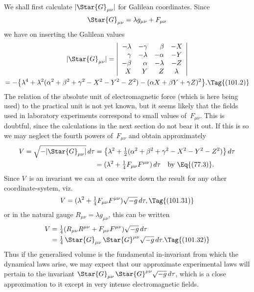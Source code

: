 \documentclass[12pt]{book}
\begin{document}
We shall first calculate $|\Star{G}_{\mu\nu}|$ for Galilean coordinates. Since
\[
\Star{G}_{\mu\nu} = \lambda g_{\mu\nu} + F_{\mu\nu}
\]
we have on inserting the Galilean values
\begin{multline*}
  |\Star{G}_{\mu\nu}|
  = \left\lvert
  \begin{array}{r@{\quad}r@{\quad}r@{\quad}c}
  -\lambda & -\gamma & \beta & -X \\
  \gamma & -\lambda & -\alpha & -Y \\
  -\beta & \alpha & -\lambda & -Z \\
  X & Y & Z & \lambda \\
  \end{array}\right\rvert \\
  = -\bigl\{\lambda^{4}
  + \lambda^{2}(\alpha^{2} + \beta^{2} + \gamma^{2} - X^{2} - Y^{2} - Z^{2})
  - (\alpha X + \beta Y + \gamma Z)^{2}\bigr\}.
  \Tag{(101.2)}
\end{multline*}
The relation of the absolute unit of electromagnetic force (which is here being
used) to the practical unit is not yet known, but it seems likely that the fields
used in laboratory experiments correspond to small values of~$F_{\mu\nu}$\footnotemark.\footnotetext
  {This is doubtful, since the calculations in the next section do not bear it out.}
If this is
so we may neglect the fourth powers of~$F_{\mu\nu}$ and obtain approximately
\begin{align*}
  V = \sqrt{-|\Star{G}_{\mu\nu}|}\, d\tau
  &= \bigl\{\lambda^{2} + \tfrac{1}{2}(\alpha^{2} + \beta^{2} + \gamma^{2} - X^{2} - Y^{2} - Z^{2})\bigr\}\, d\tau \\
  &= (\lambda^{2} + \tfrac{1}{4} F_{\mu\nu} F^{\mu\nu})\, d\tau
  \quad\text{by~\Eq{(77.3)}.}
\end{align*}
Since $V$~is an invariant we can at once write down the result for any other
coordinate-system, viz.\
\[
V = (\lambda^{2} + \tfrac{1}{4} F_{\mu\nu} F^{\mu\nu}) \sqrt{-g}\, d\tau,
\Tag{(101.31)}
\]
or in the natural gauge $R_{\mu\nu} = \lambda g_{\mu\nu}$, this can be written
\begin{align*}
V &= \tfrac{1}{4} (R_{\mu\nu} R^{\mu\nu} + F_{\mu\nu} F^{\mu\nu}) \sqrt{-g}\, d\tau \\
&= \tfrac{1}{4}\, \Star{G}_{\mu\nu}\, \Star{G}^{\mu\nu} \sqrt{-g}\, d\tau.
\Tag{(101.32)}
\end{align*}
Thus if the generalised volume is the fundamental in-invariant from which
the dynamical laws arise, we may expect that our approximate experimental
laws will pertain to the invariant $\Star{G}_{\mu\nu}\, \Star{G}^{\mu\nu} \sqrt{-g}\, d\tau$, which is a close approximation
to it except in very intense electromagnetic fields.
\end{document}
